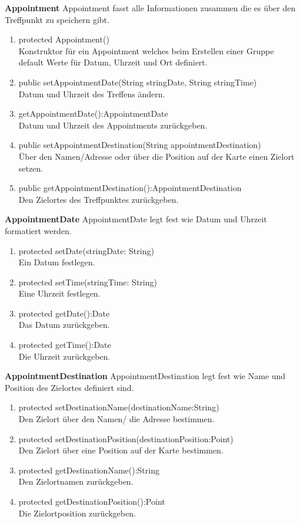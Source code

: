 \textbf{Appointment}
Appointment fasst alle Informationen zusammen die es über den Treffpunkt zu speichern gibt.
\begin{enumerate}
	\item protected Appointment()\\	
		Konstruktor für ein Appointment welches beim Erstellen einer Gruppe default Werte für Datum, Uhrzeit und Ort definiert.
	\item public setAppointmentDate(String stringDate, String stringTime)\\
		Datum und Uhrzeit des Treffens ändern.
	\item getAppointmentDate():AppointmentDate \\
		Datum und Uhrzeit des Appointments zurückgeben.
	\item public setAppointmentDestination(String appointmentDestination)\\
		Über den Namen/Adresse oder über die Position auf der Karte einen Zielort setzen.
	\item public getAppointmentDestination():AppointmentDestination\\
		Den Zielortes des Treffpunktes zurückgeben.
\end{enumerate}

\textbf{AppointmentDate}
AppointmentDate legt fest wie Datum und Uhrzeit formatiert werden.
\begin{enumerate}
	\item protected setDate(stringDate: String)\\
		Ein Datum festlegen.
	\item protected setTime(stringTime: String)\\
		Eine Uhrzeit festlegen.
	\item protected getDate():Date \\
		Das Datum zurückgeben.
	\item protected getTime():Date \\
		Die Uhrzeit zurückgeben.
\end{enumerate}

\textbf{AppointmentDestination}
AppointmentDestination legt fest wie Name und Position des Zielortes definiert sind.
\begin{enumerate}
	\item protected setDestinationName(destinationName:String)\\
		Den Zielort über den Namen/ die Adresse bestimmen.
	\item protected setDestinationPosition(destinationPosition:Point)\\
		Den Zielort über eine Position auf der Karte bestimmen.
	\item protected getDestinationName():String \\
		Den Zielortnamen zurückgeben.
	\item protected getDestinationPosition():Point \\
		Die Zielortposition zurückgeben.
\end{enumerate}

